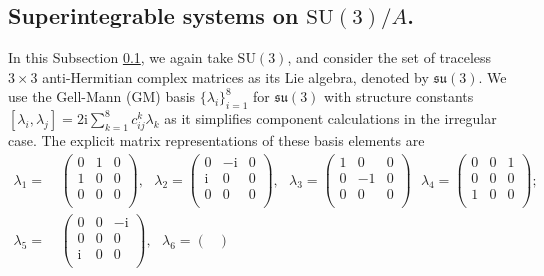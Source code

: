 \documentclass[11pt]{amsart}
\theoremstyle{definition}
\theoremstyle{plain}
\theoremstyle{conclusion}
\begin{document}
\subsection{Superintegrable systems on \texorpdfstring{$\mathrm{SU}(3)/A$}{SU(3)/A}.}
\label{subsec:irregular}
 In this Subsection \ref{subsec:irregular}, we again take $\mathrm{SU}(3)$, and consider the set of traceless $3 \times 3$ anti-Hermitian complex matrices as its Lie algebra, denoted by $\mathfrak{su}(3)$. We use the Gell-Mann (GM) basis $\{\lambda_i\}_{i=1}^8$ for $\mathfrak{su}(3)$ with structure constants $[ \lambda_i,\lambda_j]=2\mathrm{i}\sum_{k = 1}^8c_{ij}^k\lambda_k$ as it simplifies component calculations in the irregular case. The explicit matrix representations of these basis elements are \begin{align*}
     \lambda_1 = & \, \begin{pmatrix}
         0 & 1 & 0\\
        1 & 0 & 0 \\
      0 & 0 & 0  \\
     \end{pmatrix}, \text{ }  \lambda_2 =     \begin{pmatrix}
         0 & -\mathrm{i} & 0\\
        \mathrm{i} & 0 & 0 \\
      0 & 0 & 0  \\
     \end{pmatrix},\text{ } \lambda_3 =     \begin{pmatrix}
         1 & 0 & 0\\
        0 & -1 & 0 \\
      0 & 0 & 0  \\
     \end{pmatrix}\text{ } \lambda_4 =     \begin{pmatrix}
         0 & 0 & 1\\
        0 & 0 & 0 \\
      1 & 0 & 0  \\
     \end{pmatrix} ;\\
     \lambda_5 = & \, \begin{pmatrix}
         0 & 0 & -\mathrm{i}\\
        0 & 0 & 0 \\
      \mathrm{i} & 0 & 0  \\
     \end{pmatrix}, \text{ }  \lambda_6 =     \begin{pmatrix}

\end{pmatrix}
\end{align*}
\end{document}
